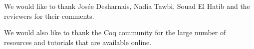 \documentclass[sigplan,review,9pt]{acmart}\settopmatter{printfolios=true,printccs=false,printacmref=false}
\begin{document}
\newpage

\begin{acks}
  We would like to thank Josée Desharnais, Nadia Tawbi, Souad El Hatib and the reviewers for their comments.

  We would also like to thank the Coq community for the large number of resources and tutorials that are available online.
\end{acks}


\end{document}
